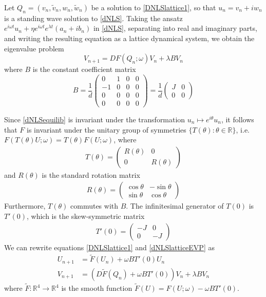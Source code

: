 \documentclass[12pt]{article}
\def\R{{\mathbb R}}
\begin{document}
Let $Q_n = (v_n, \tilde{v}_n, w_n, \tilde{w}_n)$ be a solution to \eqref{DNLSlattice1}, so that $u_n = v_n + i w_n$ is a standing wave solution to \eqref{dNLS}. Taking the ansatz $e^{i\omega t} u_n + \eta e^{i\omega t} e^{\lambda t} (a_n + i b_n)$ in \eqref{dNLS}, separating into real and imaginary parts, and writing the resulting equation as a lattice dynamical system, we obtain the eigenvalue problem
\begin{equation}\label{dNLSlatticeEVP}
V_{n+1} = DF(Q_n; \omega) V_n + \lambda B V_n
\end{equation}
where $B$ is the constant coefficient matrix 
\begin{equation}\label{dNLSB}
B = \frac{1}{d}
\begin{pmatrix}
0 & 1 & 0 & 0 \\
-1 & 0 & 0 & 0 \\
0 & 0 & 0 & 0 \\
0 & 0 & 0 & 0
\end{pmatrix} = 
\frac{1}{d}
\begin{pmatrix}
J & 0 \\
0 & 0 
\end{pmatrix}
\end{equation}

Since \eqref{dNLSequilib} is invariant under the transformation $u_n \mapsto e^{i \theta}u_n$, it follows that $F$ is invariant under the unitary group of symmetries $\{T(\theta) : \theta \in \R\}$, i.e. $F(T(\theta)U; \omega) = T(\theta)F(U; \omega)$, where
\begin{align}\label{TdNLS}
T(\theta) =
\begin{pmatrix}
R(\theta) & 0 \\
0 & R(\theta)
\end{pmatrix}
\end{align}
and $R(\theta)$ is the standard rotation matrix
\begin{align*}
R(\theta) =
\begin{pmatrix}
\cos\theta & -\sin\theta \\
\sin\theta & \cos\theta
\end{pmatrix}
\end{align*}
Furthermore, $T(\theta)$ commutes with $B$. The infinitesimal generator of $T(0)$ is $T'(0)$, which is the skew-symmetric matrix
\begin{align}\label{dnlsSgen}
T'(0) = \begin{pmatrix}
-J & 0 \\
0 & -J 
\end{pmatrix}
\end{align}
We can rewrite equations \eqref{DNLSlattice1} and \eqref{dNLSlatticeEVP} as
\begin{align}
U_{n+1} &= \tilde{F}(U_n) + \omega B T'(0) U_n \label{DNLSlattice2} \\
V_{n+1} &= (D\tilde{F}(Q_n) + \omega B T'(0)) V_n + \lambda B V_n \label{dNLSlatticeEVP2} 
\end{align}
where $\tilde{F}:\R^4 \rightarrow \R^4$ is the smooth function $\tilde{F}(U) = F(U; \omega) - \omega B T'(0)$. 
\end{document}
